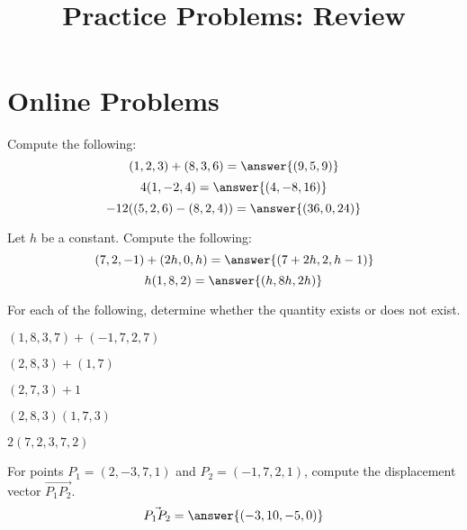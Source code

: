 \documentclass{ximera}
\title{Practice Problems: Review}
\begin{document}
\begin{abstract}
\end{abstract}
\maketitle
\section*{Online Problems}
\begin{problem}
Compute the following:
\[
(1,2,3)+(8,3,6)=\answer{(9,5,9)}
\]
\[
4(1,-2,4)=\answer{(4,-8,16)}
\]
\[
-12((5,2,6)-(8,2,4))=\answer{(36,0,24)}
\]
\end{problem}

\begin{problem}
Let $h$ be a constant. Compute the following:
\[
(7,2,-1)+(2h,0,h)=\answer{(7+2h,2,h-1)}
\]
\[
h(1,8,2)=\answer{(h,8h,2h)}
\]
\end{problem}

\begin{problem}
For each of the following, determine whether the quantity exists or does not exist.

$(1,8,3,7)+(-1,7,2,7)$
\begin{multipleChoice}
\end{multipleChoice}

$(2,8,3)+(1,7)$
\begin{multipleChoice}
\end{multipleChoice}

$(2,7,3)+1$
\begin{multipleChoice}
\end{multipleChoice}

$(2,8,3)(1,7,3)$
\begin{multipleChoice}
\end{multipleChoice}

$2(7,2,3,7,2)$
\begin{multipleChoice}
\end{multipleChoice}

\end{problem}

\begin{problem}
For points $P_1=(2,-3,7,1)$ and $P_2=(-1,7,2,1)$, compute the displacement vector $\vec{P_1P_2}$.
\[
\vec{P_1P_2} = \answer{(-3,10,-5,0)}
\]
\end{problem}
\end{document}

